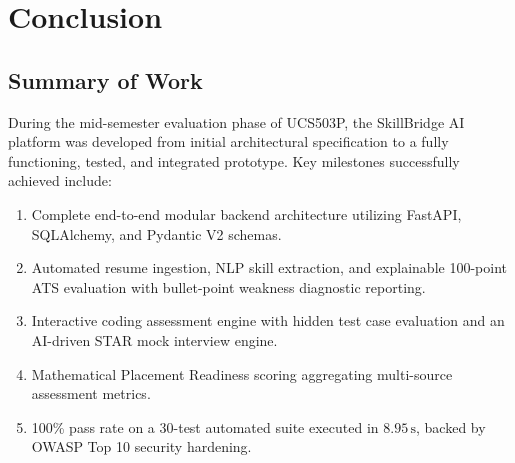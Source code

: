 \documentclass[12pt,a4paper,oneside]{report}
\begin{document}
\setcounter{page}{11}
\chapter{Conclusion}

\section{Summary of Work}
During the mid-semester evaluation phase of UCS503P, the SkillBridge AI platform was developed from initial architectural specification to a fully functioning, tested, and integrated prototype. Key milestones successfully achieved include:
\begin{enumerate}[leftmargin=0.8cm]
    \item Complete end-to-end modular backend architecture utilizing FastAPI, SQLAlchemy, and Pydantic V2 schemas.
    \item Automated resume ingestion, NLP skill extraction, and explainable 100-point ATS evaluation with bullet-point weakness diagnostic reporting.
    \item Interactive coding assessment engine with hidden test case evaluation and an AI-driven STAR mock interview engine.
    \item Mathematical Placement Readiness scoring aggregating multi-source assessment metrics.
    \item 100\% pass rate on a 30-test automated suite executed in $8.95\,\text{s}$, backed by OWASP Top 10 security hardening.
\end{enumerate}
\end{document}

